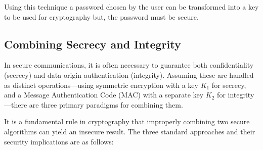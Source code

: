 Using this technique a password chosen by the user can be transformed into a key to be used for cryptography but, the password must be secure.


\subsection{Combining Secrecy and Integrity}
In secure communications, it is often necessary to guarantee both confidentiality (secrecy) and data origin authentication (integrity). Assuming these are handled as distinct operations---using symmetric encryption with a key $K_1$ for secrecy, and a Message Authentication Code (MAC) with a separate key $K_2$ for integrity---there are three primary paradigms for combining them.

It is a fundamental rule in cryptography that improperly combining two secure algorithms can yield an insecure result. The three standard approaches and their security implications are as follows:

